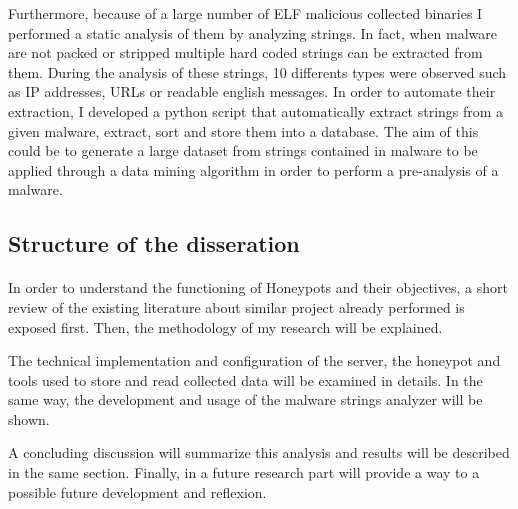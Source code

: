 Furthermore, because of a large number of ELF malicious collected binaries I performed a static
analysis of them by analyzing strings. In fact, when malware are not packed or stripped multiple
 hard coded strings can be extracted from them. During the analysis of these strings, 10 differents
 types were observed such as IP addresses, URLs or readable english messages. In order to automate 
 their extraction, I developed a python script that automatically extract strings from a given
 malware, extract, sort and store them into a database. The aim of this could be to generate 
 a large dataset from strings contained in malware to be applied through a data mining algorithm
 in order to perform a pre-analysis of a malware.

\subsection{Structure of the disseration} %

\paragraph{}

In order to understand the functioning of Honeypots and their objectives, a short review of
the existing literature about similar project already performed is exposed first. Then, the 
methodology of my research will be explained.

The technical implementation and configuration of the server, the honeypot and tools used to
store and read collected data will be examined in details. In the same way, the development 
and usage of the malware strings analyzer will be shown.

A concluding discussion will summarize this analysis and results will be described in the
same section. Finally, in a future research part will provide a way to a possible future development
and reflexion.
